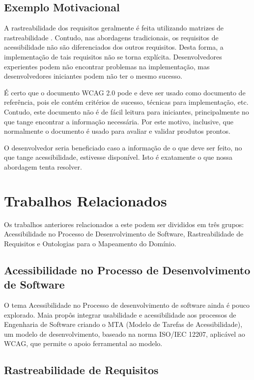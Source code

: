 \documentclass[runningheads,a4paper]{llncs}
\begin{document}
\subsection{Exemplo Motivacional}

A rastreabilidade dos requisitos geralmente é feita utilizando matrizes de
rastreabilidade \cite{guo:2009:OBI:1681515.1682933}. Contudo, nas abordagens tradicionais, os
requisitos de acessibilidade não são diferenciados dos outros requisitos. Desta
forma, a implementação de tais requisitos não se torna explícita.
Desenvolvedores experientes podem não encontrar problemas na implementação, mas
desenvolvedores iniciantes podem não ter o mesmo sucesso.

É certo que o documento WCAG 2.0 pode e deve ser usado como documento de
referência, pois ele contém critérios de sucesso, técnicas para implementação,
etc. Contudo, este documento não é de fácil leitura para iniciantes,
principalmente no que tange encontrar a informação necessária. Por este motivo,
inclusive, que normalmente o documento é usado para avaliar e validar produtos
prontos.

O desenvolvedor seria beneficiado caso a informação de o que deve ser feito, no
que tange acessibilidade, estivesse disponível. Isto é exatamente o que nossa
abordagem tenta resolver.

\section{Trabalhos Relacionados}

Os trabalhos anteriores relacionados a este podem ser divididos em três grupos:
Acessibilidade no Processo de Desenvolvimento de Software, Rastreabilidade de
Requisitos e Ontologias para o Mapeamento do Domínio.

\subsection{Acessibilidade no Processo de Desenvolvimento de Software}

O tema Acessibilidade no Processo de desenvolvimento de software ainda
é pouco explorado. Maia \cite{maia:10} propôs  integrar usabilidade e
acessibilidade aos processos de Engenharia de Software criando o MTA (Modelo de
Tarefas de Acessibilidade), um modelo de desenvolvimento, baseado na norma ISO/IEC 12207, aplicável
ao WCAG, que permite o apoio ferramental ao modelo.

\subsection{Rastreabilidade de Requisitos}
\end{document}
